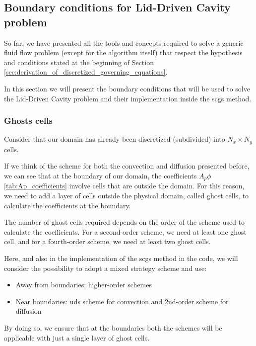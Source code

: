 \subsection{Boundary conditions for Lid-Driven Cavity problem}
\label{subsec:boundary_conditions_for_lid_driven}

So far, we have presented all the tools and concepts required to solve a generic fluid flow problem (except for the algorithm itself) that respect the hypothesis and conditions stated at the beginning of Section \ref{sec:derivation_of_discretized_governing_equations}.

In this section we will present the boundary conditions that will be used to solve the Lid-Driven Cavity problem and their implementation inside the \acrshort{scgs} method.



\subsubsection{Ghosts cells}

Consider that our domain has already been discretized (subdivided) into $N_x \times N_y$ cells.

If we think of the scheme for both the convection and diffusion presented before, we can see that at the boundary of our domain, the coefficients $A_p\phi$ \ref{tab:Ap_coefficients} involve cells that are outside the domain.
For this reason, we need to add a layer of cells outside the physical domain, called ghost cells, to calculate the coefficients at the boundary.

The number of ghost cells required depends on the order of the scheme used to calculate the coefficients. For a second-order scheme, we need at least one ghost cell, and for a fourth-order scheme, we need at least two ghost cells.

Here, and also in the implementation of the \acrshort{scgs} method in the code, we will consider the possibility to adopt a mixed strategy scheme and use:

\begin{itemize}
    \item Away from boundaries: higher-order schemes
    \item Near boundaries: \acrshort{uds} scheme for convection and 2nd-order scheme for diffusion
\end{itemize}

By doing so, we ensure that at the boundaries both the schemes will be applicable with just a single layer of ghost cells.

